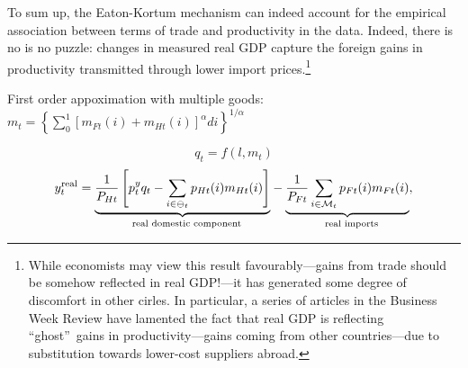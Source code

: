 \documentclass[12pt]{article}
\begin{document}
To sum up, the Eaton-Kortum mechanism can indeed account for the empirical
association between terms of trade and productivity in the data. Indeed,
there is no is no puzzle: changes in measured real GDP capture the foreign
gains in productivity transmitted through lower import prices.\footnote{%
While economists may view this result favourably---gains from trade should
be somehow reflected in real GDP!---it has generated some degree of
discomfort in other cirles. In particular, a series of articles in the
Business Week Review have lamented the fact that real GDP is reflecting
\textquotedblleft ghost\textquotedblright\ gains in productivity---gains
coming from other countries---due to substitution towards lower-cost
suppliers abroad.}

\bigskip 

\bigskip 

First order appoximation with multiple goods:$m_{t}=\left\{
\sum_{0}^{1}[m_{Ft}(i)+m_{Ht}(i)]^{\alpha }di\right\} ^{1/\alpha }$

\bigskip 

\begin{equation}
q_{t}=f(l,m_{t})
\end{equation}%
\begin{equation}
y_{t}^{\func{real}}=\underset{\text{real domestic component}}{\underbrace{%
\frac{1}{P_{Ht}}\left[ p_{t}^{y}q_{t}-\sum\limits_{i\in \mathcal{\Psi }%
_{t}}p_{Ht}(i)m_{Ht}(i)\right] }}-\underset{\text{real imports}}{\underbrace{%
\frac{1}{P_{Ft}}\sum\limits_{i\in \mathcal{M}_{t}}p_{Ft}(i)m_{Ft}(i)}},
\end{equation}
\end{document}
